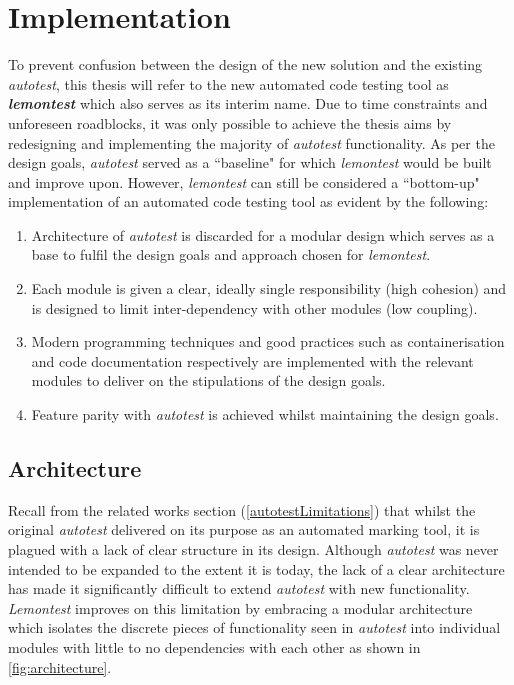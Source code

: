 \documentclass[hidelinks]{report}
\newcommand{\unchapter}[2]{
    \setcounter{chapter}{#1}
    \setcounter{section}{0}
    \chapter*{#2}
    \addcontentsline{toc}{chapter}{#2}
}
\begin{document}
\unchapter{5}{Implementation}
To prevent confusion between the design of the new solution and the existing \textit{autotest}, this thesis will refer to the new automated code testing tool as \textbf{\textit{lemontest}} which also serves as its interim name.
Due to time constraints and unforeseen roadblocks, it was only possible to achieve the thesis aims by redesigning and implementing the majority of \textit{autotest} functionality.
As per the design goals, \textit{autotest} served as a ``baseline" for which \textit{lemontest} would be built and improve upon. However, \textit{lemontest} can still be considered a ``bottom-up" implementation of an automated code testing tool as evident by the following:
\begin{enumerate}
	\item Architecture of \textit{autotest} is discarded for a modular design which serves as a base to fulfil the design goals and approach chosen for \textit{lemontest}.
	\item Each module is given a clear, ideally single responsibility (high cohesion) and is designed to limit inter-dependency with other modules (low coupling).
	\item Modern programming techniques and good practices such as containerisation and code documentation respectively are implemented with the relevant modules to deliver on the stipulations of the design goals.
	\item Feature parity with \textit{autotest} is achieved whilst maintaining the design goals.
\end{enumerate}

\section{Architecture}\label{architecture}
Recall from the related works section (\autoref{autotestLimitations}) that whilst the original \textit{autotest} delivered on its purpose as an automated marking tool, it is plagued with a lack of clear structure in its design. Although \textit{autotest} was never intended to be expanded to the extent it is today, the lack of a clear architecture has made it significantly difficult to extend \textit{autotest} with new functionality. \textit{Lemontest} improves on this limitation by embracing a modular architecture which isolates the discrete pieces of functionality seen in \textit{autotest} into individual modules with little to no dependencies with each other as shown in \autoref{fig:architecture}.
\end{document}
